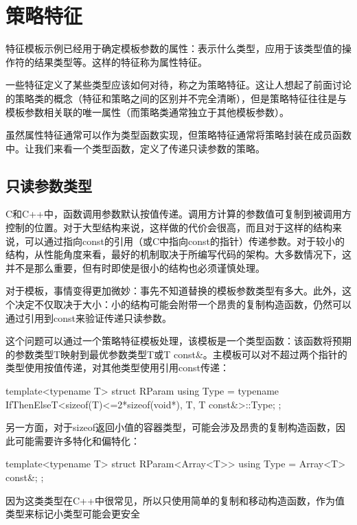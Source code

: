 \section{策略特征}

特征模板示例已经用于确定模板参数的属性：表示什么类型，应用于该类型值的操作符的结果类型等。这样的特征称为属性特征。

一些特征定义了某些类型应该如何对待，称之为策略特征。这让人想起了前面讨论的策略类的概念（特征和策略之间的区别并不完全清晰），但是策略特征往往是与模板参数相关联的唯一属性（而策略类通常独立于其他模板参数）。

虽然属性特征通常可以作为类型函数实现，但策略特征通常将策略封装在成员函数中。让我们来看一个类型函数，定义了传递只读参数的策略。

\subsection{只读参数类型}

C和C++中，函数调用参数默认按值传递。调用方计算的参数值可复制到被调用方控制的位置。对于大型结构来说，这样做的代价会很高，而且对于这样的结构来说，可以通过指向const的引用（或C中指向const的指针）传递参数。对于较小的结构，从性能角度来看，最好的机制取决于所编写代码的架构。大多数情况下，这并不是那么重要，但有时即使是很小的结构也必须谨慎处理。

对于模板，事情变得更加微妙：事先不知道替换的模板参数类型有多大。此外，这个决定不仅取决于大小：小的结构可能会附带一个昂贵的复制构造函数，仍然可以通过引用到const来验证传递只读参数。

这个问题可以通过一个策略特征模板处理，该模板是一个类型函数：该函数将预期的参数类型T映射到最优参数类型T或T const\&。主模板可以对不超过两个指针的类型使用按值传递，对其他类型使用引用const传递：

\begin{cpp}
template<typename T>
struct RParam {
	using Type = typename IfThenElseT<sizeof(T)<=2*sizeof(void*),
									T,
									T const&>::Type;
};
\end{cpp}

另一方面，对于sizeof返回小值的容器类型，可能会涉及昂贵的复制构造函数，因此可能需要许多特化和偏特化：

\begin{cpp}
template<typename T>
struct RParam<Array<T>> {
	using Type = Array<T> const&;
};
\end{cpp}

因为这类类型在C++中很常见，所以只使用简单的复制和移动构造函数，作为值类型来标记小类型可能会更安全

